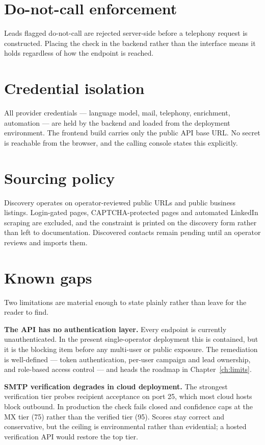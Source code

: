 \documentclass[11pt,a4paper]{report}
\begin{document}
\section{Do-not-call enforcement}
Leads flagged do-not-call are rejected server-side before a telephony request is constructed. Placing the check in the backend rather than the interface means it holds regardless of how the endpoint is reached.

\section{Credential isolation}
All provider credentials --- language model, mail, telephony, enrichment, automation --- are held by the backend and loaded from the deployment environment. The frontend build carries only the public API base URL. No secret is reachable from the browser, and the calling console states this explicitly.

\section{Sourcing policy}
Discovery operates on operator-reviewed public URLs and public business listings. Login-gated pages, CAPTCHA-protected pages and automated LinkedIn scraping are excluded, and the constraint is printed on the discovery form rather than left to documentation. Discovered contacts remain pending until an operator reviews and imports them.

\section{Known gaps}
\label{sec:gaps}
Two limitations are material enough to state plainly rather than leave for the reader to find.

\textbf{The API has no authentication layer.} Every endpoint is currently unauthenticated. In the present single-operator deployment this is contained, but it is the blocking item before any multi-user or public exposure. The remediation is well-defined --- token authentication, per-user campaign and lead ownership, and role-based access control --- and heads the roadmap in Chapter~\ref{ch:limits}.

\textbf{SMTP verification degrades in cloud deployment.} The strongest verification tier probes recipient acceptance on port 25, which most cloud hosts block outbound. In production the check fails closed and confidence caps at the MX tier (75) rather than the verified tier (95). Scores stay correct and conservative, but the ceiling is environmental rather than evidential; a hosted verification API would restore the top tier.
\end{document}
